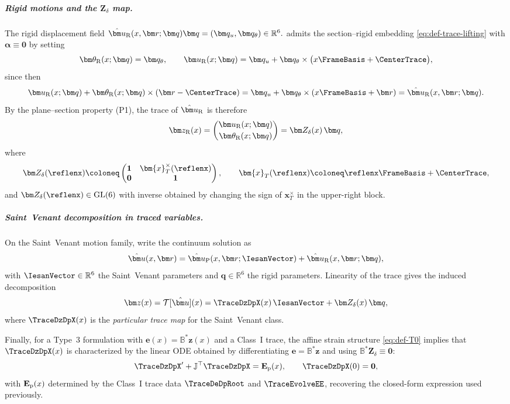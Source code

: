 \subparagraph{Rigid motions and the $\bm Z_\delta$ map.}
The rigid displacement field 
\(
  \hat{\bm u}_{\rm R}(x,\bm r;\bm q)
  \bm q=(\bm q_u,\bm q_\theta)\in\mathbb R^6.
\) 
admits the section--rigid embedding \eqref{eq:def-trace-lifting} with $\bm\alpha\equiv\mathbf 0$ by setting
\[
  \bm\theta_{\rm R}(x;\bm q)=\bm q_\theta,
  \qquad
  \bm u_{\rm R}(x;\bm q)=\bm q_u+\bm q_\theta\times\bigl(x\FrameBasis+\CenterTrace\bigr),
\]
since then
\[
  \bm u_{\rm R}(x;\bm q)+\bm\theta_{\rm R}(x;\bm q)\times(\bm r-\CenterTrace)
  =\bm q_u+\bm q_\theta\times(x\FrameBasis+\bm r)
  =\hat{\bm u}_{\rm R}(x,\bm r;\bm q).
\]
By the plane--section property (P1), the trace of $\hat{\bm u}_{\rm R}$ is therefore
\[
  \bm z_{\rm R}(x)=
  \begin{pmatrix}
  \bm u_{\rm R}(x;\bm q)\\[2pt]
  \bm\theta_{\rm R}(x;\bm q)
  \end{pmatrix}
  =\bm Z_\delta(x)\,\bm q,
\]
where
\begin{equation}
  \bm Z_{\delta}(\reflenx)
  \coloneq
  \begin{pmatrix}
    \mathbf{1} & \bm{x}_T^{\times}(\reflenx) \\
    \mathbf{0} & \mathbf{1}
  \end{pmatrix},
  \qquad
  \bm{x}_T(\reflenx)\coloneq \reflenx\FrameBasis+\CenterTrace,
  \label{eq:def-z-delta-embed}
\end{equation}
and $\bm Z_\delta(\reflenx)\in \mathrm{GL}(6)$ with inverse obtained by changing the sign of
$\bm{x}_T^{\times}$ in the upper-right block.

\subparagraph{Saint~Venant decomposition in traced variables.}
On the Saint~Venant motion family, write the continuum solution as
\[
  \hat{\bm u}(x,\bm r)
  =\hat{\bm u}_{\rm P}(x,\bm r;\IesanVector)+\hat{\bm u}_{\rm R}(x,\bm r;\bm q),
\]
with $\IesanVector\in\mathbb R^6$ the Saint~Venant parameters and $\bm q\in\mathbb R^6$ the rigid parameters.
Linearity of the trace gives the induced decomposition
\begin{equation}
  \bm z(x)
  =\mathcal T[\hat{\bm u}](x)
  =\TraceDzDpX(x)\,\IesanVector+\bm Z_\delta(x)\,\bm q,
  \label{eq:trace-z-embed}
\end{equation}
where $\TraceDzDpX(x)$ is the \emph{particular trace map} for the Saint~Venant class.

Finally, for a Type~3 formulation with $\bm e(x)=\mathbb B^*\bm z(x)$ and a Class~I trace,
the affine strain structure \eqref{eq:def-T0} implies that $\TraceDzDpX(x)$ is characterized by the linear ODE obtained by differentiating
$\bm e=\mathbb B^*\bm z$ and using $\mathbb B^*\bm Z_\delta\equiv \mathbf 0$:
\[
  \TraceDzDpX' + \mathbb J^\top \TraceDzDpX = \mathbf E_{\rm p}(x),
  \qquad
  \TraceDzDpX(0)=\mathbf 0,
\]
with $\mathbf E_{\rm p}(x)$ determined by the Class~I trace data  $\TraceDeDpRoot$ and $\TraceEvolveEE$, recovering the closed-form expression used previously.
